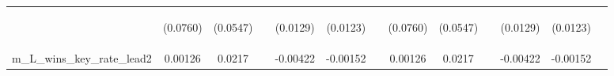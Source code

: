 \documentclass[]{article}
\begin{document}
\begin{center}
\begin{tabular}{lcccccccccccc}
\vspace{4pt} & \begin{footnotesize}(0.0760)\end{footnotesize} & \begin{footnotesize}(0.0547)\end{footnotesize} & \begin{footnotesize}\end{footnotesize} & \begin{footnotesize}(0.0129)\end{footnotesize} & \begin{footnotesize}(0.0123)\end{footnotesize} & \begin{footnotesize}\end{footnotesize} & \begin{footnotesize}(0.0760)\end{footnotesize} & \begin{footnotesize}(0.0547)\end{footnotesize} & \begin{footnotesize}\end{footnotesize} & \begin{footnotesize}(0.0129)\end{footnotesize} & \begin{footnotesize}(0.0123)\end{footnotesize} & \begin{footnotesize}\end{footnotesize} \\
m\_L\_wins\_key\_rate\_lead2 & 0.00126 & 0.0217 &  & -0.00422 & -0.00152 &  & 0.00126 & 0.0217 &  & -0.00422 & -0.00152 &  \\

\end{tabular}
\end{center}
\end{document}
